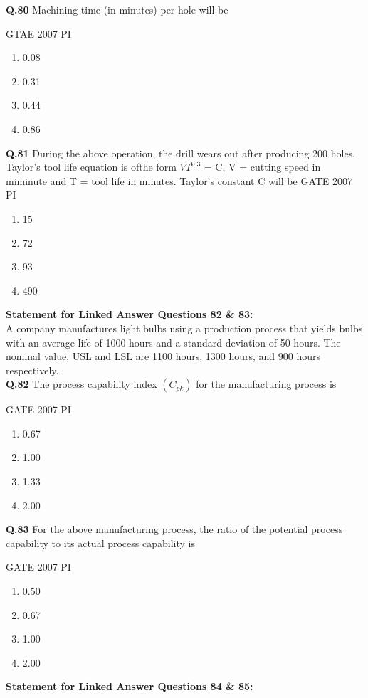 \documentclass[journal,12pt,onecolumn]{exam}
\theoremstyle{remark}
\begin{document}
    \noindent
    \textbf{Q.80}
    Machining time (in minutes) per hole will be

    \hfill{GTAE 2007 PI}
\begin{enumerate}
    \item 0.08
    \item 0.31
    \item 0.44
    \item 0.86
    \end{enumerate}
    \noindent
    \textbf{Q.81}
    During the above operation, the drill wears out after producing 200 holes. Taylor's tool life equation is ofthe form $VT^{0.3}$
 = C, V = cutting speed in miminute and T = tool life in minutes. Taylor's constant C will be
    \hfill{GATE 2007 PI}
    \begin{enumerate}
        \item 15
        \item 72
        \item 93
        \item 490
        \end{enumerate}
        \textbf{Statement for Linked Answer Questions  82 \& 83:}\\
        
        A company manufactures light bulbs using a production process that yields bulbs with an average life of 1000 hours and a standard deviation of 50 hours. The nominal value, USL and LSL are 1100 hours, 1300 hours, and 900 hours respectively.\\
        
        \noindent
        \textbf{Q.82}
        The process capability index $(C_{pk})$ for the manufacturing process is
        
\hfill{GATE 2007 PI}
\begin{enumerate}
    \item 0.67
    \item 1.00
    \item 1.33
    \item 2.00
    \end{enumerate}
    \noindent
    \textbf{Q.83}
 For the above manufacturing process, the ratio of the potential process capability to its actual process capability is
 
 \hfill{GATE 2007 PI}
 \begin{enumerate}
     \item 0.50
     \item 0.67
     \item 1.00
     \item 2.00
 \end{enumerate}
 \textbf{Statement for Linked Answer Questions 84 \& 85:}\\
 
\end{document}
